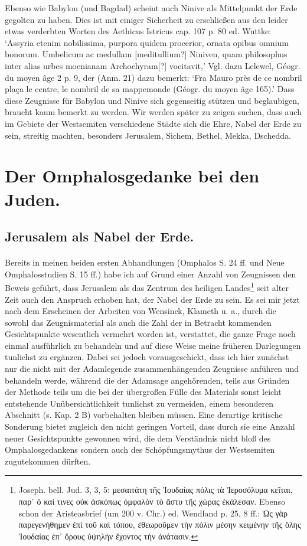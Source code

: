 \documentclass[a4paper, 11pt, oneside]{article}
\begin{document}
Ebenso wie Babylon (und Bagdad) scheint auch Ninive als Mittelpunkt der Erde gegolten zu haben. Dies ist mit einiger Sicherheit zu erschließen aus den leider etwas verderbten Worten des Aethicus Istricus cap. 107 p. 80 ed. Wuttke: `Assyria etenim nobilissima, purpora quidem procerior, ornata opibus omnium bonorum. Umbelicum ac medullam [meditullium?] Niniven, quam philosophus inter alias urbes moenianam Archochyram[?] vocitavit,' Vgl. dazu Lelewel, Géogr. du moyen âge 2 p. 9, der (Anm. 21) dazu bemerkt: `Fra Mauro près de ce nombril plaça le centre, le nombril de sa mappemonde (Géogr. du moyen âge 165).' Dass diese Zeugnisse für Babylon und Ninive sich gegenseitig stützen und beglaubigen, braucht kaum bemerkt zu werden. Wir werden später zu zeigen suchen, dass auch im Gebiete der Westsemiten verschiedene Städte sich die Ehre, Nabel der Erde zu sein, streitig machten, besonders Jerusalem, Sichem, Bethel, Mekka, Dschedda.
\clearpage
\section{Der Omphalosgedanke bei den Juden.}
\subsection{Jerusalem als Nabel der Erde.}
\paragraph{}
Bereits in meinen beiden ersten Abhandlungen (Omphalos S. 24 ff. und Neue Omphalosstudien S. 15 ff.) habe ich auf Grund einer Anzahl von Zeugnissen den Beweis geführt, dass Jerusalem als das Zentrum des heiligen Landes\footnote{Joseph. bell. Jud. 3, 3, 5: μεσαιτάτη τῆς Ἰουδαίας πόλις τὰ Ἱεροσόλυμα κεῖται, παρ᾽ ὃ καί τινες οὐκ ἀσκόπως ὀμφαλὸν τὸ ἄστυ τῆς χώρας ἐκάλεσαν. Ebenso schon der Aristeasbrief (um 200 v. Chr.) ed. Wendland p. 25, 8 ff.: Ὡς γὰρ παρεγενήθημεν ἐπὶ τοῦ καὶ τόπου, ἐθεωροῦμεν τὴν πόλιν μέσην κειμένην τῆς ὅλης Ἰουδαίας ἐπ᾽ ὄρους ὑψηλὴν ἔχοντος τὴν ἀνάτασιν.} seit alter Zeit auch den Anspruch erhoben hat, der Nabel der Erde zu sein. Es sei mir jetzt nach dem Erscheinen der Arbeiten von Wensinck, Klameth u. a., durch die sowohl das Zeugnismaterial als auch die Zahl der in Betracht kommenden Gesichtspunkte wesentlich vermehrt worden ist, verstattet, die ganze Frage noch einmal ausführlich zu behandeln und auf diese Weise meine früheren Darlegungen tunlichst zu ergänzen. Dabei sei jedoch vorausgeschickt, dass ich hier zunächst nur die nicht mit der Adamlegende zusammenhängenden Zeugnisse anführen und behandeln werde, während die der Adamsage angehörenden, teils aus Gründen der Methode teils um die bei der übergroßen Fülle des Materials sonst leicht entstehende Unübersichtlichkeit tunlichst zu vermeiden, einem besonderen Abschnitt (s. Kap. 2 B) vorbehalten bleiben müssen. Eine derartige kritische Sonderung bietet zugleich den nicht geringen Vorteil, dass durch sie eine Anzahl neuer Gesichtspunkte gewonnen wird, die dem Verständnis nicht bloß des Omphalosgedankens sondern auch des Schöpfungsmythus der Westsemiten zugutekommen dürften.
\end{document}
